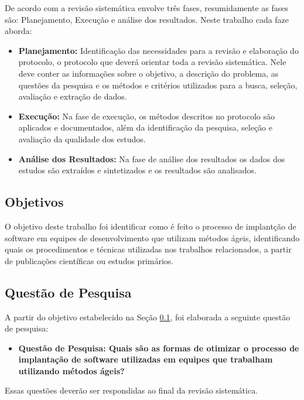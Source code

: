 \documentclass[12pt]{article}
\begin{document}
De acordo com \cite{brereton2007lessons} a revisão sistemática envolve três fases, resumidamente as fases são: Planejamento, Execução e análise dos resultados. Neste trabalho cada faze aborda:

 \begin{itemize}
   \item  \textbf{Planejamento: } Identificação  das  necessidades  para  a  revisão  e  elaboração do protocolo, o protocolo que deverá orientar toda a revisão sistemática. Nele deve conter as informações sobre o objetivo, a descrição do problema, as questões
da pesquisa e os métodos e critérios utilizados para a busca, seleção, avaliação e extração de dados.
   \item  \textbf{Execução: } Na fase de execução, os métodos descritos no protocolo são aplicados e documentados, além da identificação da pesquisa, seleção e avaliação da qualidade  dos  estudos.
      \item  \textbf{Análise dos Resultados: }Na fase de análise dos resultados os dados dos estudos são extraídos e sintetizados e os
resultados são analisados.
 \end{itemize}

\subsection{Objetivos} \label{sec3:subsec1}

O objetivo deste trabalho foi identificar como é feito o processo de implantção de software em equipes de desenvolvimento que utilizam métodos ágeis, identificando quais os procedimentos e técnicas utilizadas nos trabalhos relacionados, a partir de publicações científicas ou estudos primários.

\subsection{Questão de Pesquisa} \label{sec3:subsec2}

A partir do objetivo estabelecido na Seção \ref{sec3:subsec1}, foi elaborada a seguinte questão de pesquisa:

 \begin{itemize}
   \item  \textbf{Questão de Pesquisa: Quais são as formas de otimizar o processo de implantação de software utilizadas em equipes que trabalham utilizando métodos ágeis? }
 \end{itemize}

Essas questões deverão ser respondidas ao final da revisão sistemática.
\end{document}
